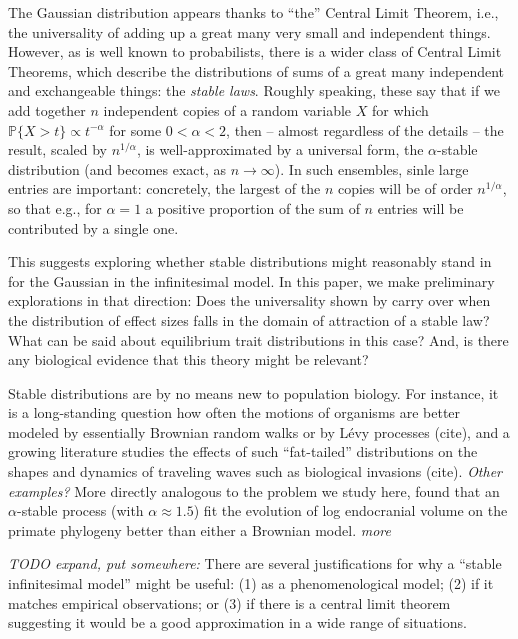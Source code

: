 \documentclass{article}
\renewcommand{\P}{\mathbb{P}}
\newcommand{\comment}[1]{{\color{blue} \it #1}}
\theoremstyle{remark}
\theoremstyle{definition}
\begin{document}
The Gaussian distribution appears thanks to ``the'' Central Limit Theorem,
i.e., the universality
of adding up a great many very small and independent things.
However, as is well known to probabilists,
there is a wider class of Central Limit Theorems,
which describe the distributions of sums of a great many independent and exchangeable things:
the \emph{stable laws}.
Roughly speaking, these say that if we add together $n$ independent copies of a random variable $X$
for which $\P\{ X > t \} \propto t^{-\alpha}$ for some $0 < \alpha < 2$,
then -- almost regardless of the details -- the result, scaled by $n^{1/\alpha}$,
is well-approximated by a universal form, the $\alpha$-stable distribution (and becomes exact, as $n \to \infty$).
In such ensembles, sinle large entries are important:
concretely, the largest of the $n$ copies will be of order $n^{1/\alpha}$,
so that e.g., for $\alpha=1$ a positive proportion of the sum of $n$ entries will be contributed by a single one.

This suggests exploring whether stable distributions might reasonably stand in for the Gaussian
in the infinitesimal model.
In this paper, we make preliminary explorations in that direction:
Does the universality shown by \citet{barton2017infinitesimal}
carry over when the distribution of effect sizes falls in the domain of attraction of a stable law?
What can be said about equilibrium trait distributions in this case?
And, is there any biological evidence that this theory might be relevant?

Stable distributions are by no means new to population biology.
For instance, it is a long-standing question how often the motions of organisms
are better modeled by essentially Brownian random walks or by L\'evy processes (cite),
and a growing literature studies the effects of such ``fat-tailed'' distributions
on the shapes and dynamics of traveling waves such as biological invasions (cite).
\comment{Other examples?}
More directly analogous to the problem we study here, \citet{landis2012phylogenetic}
found that an $\alpha$-stable process (with $\alpha \approx 1.5$) fit the evolution of log endocranial volume
on the primate phylogeny
better than either a Brownian model.
\comment{more}

\comment{TODO expand, put somewhere:}
There are several justifications for why a ``stable infinitesimal model'' might be useful:
(1) as a phenomenological model;
(2) if it matches empirical observations; or
(3) if there is a central limit theorem suggesting it would be a good approximation in a wide range of situations.
\end{document}
